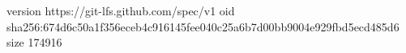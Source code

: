 version https://git-lfs.github.com/spec/v1
oid sha256:674d6c50a1f356eceb4c916145fee040c25a6b7d00bb9004e929fbd5ecd485d6
size 174916

